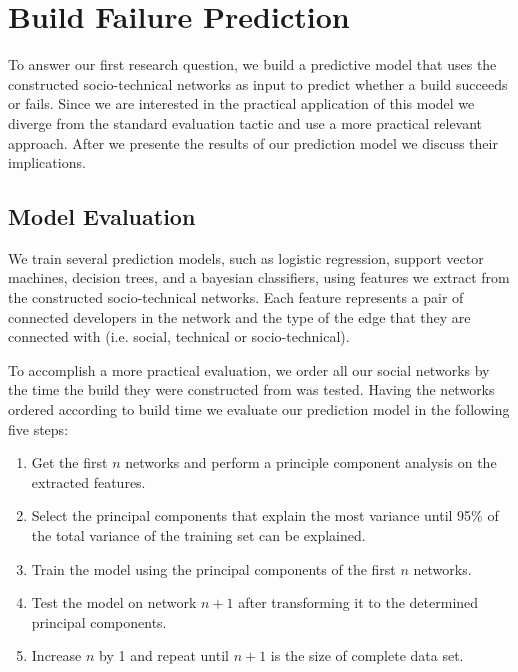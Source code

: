 \documentclass[12pt,oneside]{book}
\begin{document}
\section{Build Failure Prediction}
\label{sec:prediction}
To answer our first research question, we build a predictive model that uses the
constructed socio-technical networks as input to predict whether a build succeeds
or fails. Since we are interested in the practical application of this model we
diverge from the standard evaluation tactic and use a more practical relevant
approach. After we presente the results of our prediction model we discuss their
implications.

\subsection{Model Evaluation}
We train several prediction models, such as logistic regression, support vector
machines, decision trees, and a bayesian classifiers, using features we
extract from the constructed socio-technical networks. Each feature represents a pair of
connected developers in the network and the type of the edge that they are
connected with (i.e. social, technical or socio-technical).

To accomplish a more practical evaluation, we order all our social networks by the time the build they were constructed from was tested.
Having the networks ordered according to build time we evaluate our prediction model in the following five steps:%

\begin{enumerate}
\item Get the first $n$ networks and perform a principle component analysis on the extracted features.
\item Select the principal components that explain the most variance until 95\% of the total variance of the training set can be explained.
\item Train the model using the principal components of the first $n$ networks.
\item Test the model on network $n+1$ after transforming it to the determined principal components.
\item Increase $n$ by 1 and repeat until $n+1$ is the size of complete data set.
\end{enumerate}
\end{document}
